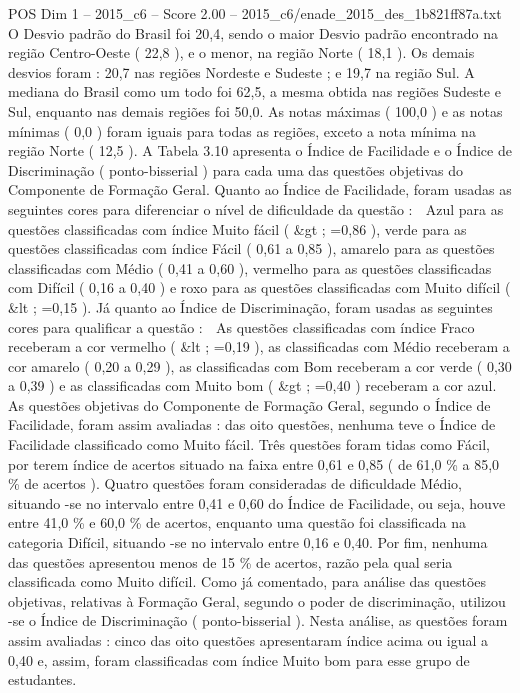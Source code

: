 \begin{textsample}{POS Dim 1 – 2015\_c6 – Score 2.00 – 2015\_c6/enade\_2015\_des\_1b821ff87a.txt}
O Desvio padrão do Brasil foi 20,4, sendo o maior Desvio padrão encontrado na região Centro-Oeste ( 22,8 ), e o menor, na região Norte ( 18,1 ).
Os demais desvios foram : 20,7 nas regiões Nordeste e Sudeste ; e 19,7 na região Sul.
A mediana do Brasil como um todo foi 62,5, a mesma obtida nas regiões Sudeste e Sul, enquanto nas demais regiões foi 50,0.
As notas máximas ( 100,0 ) e as notas mínimas ( 0,0 ) foram iguais para todas as regiões, exceto a nota mínima na região Norte ( 12,5 ).
A Tabela 3.10 apresenta o Índice de Facilidade e o Índice de Discriminação ( ponto-bisserial ) para cada uma das questões objetivas do Componente de Formação Geral.
Quanto ao Índice de Facilidade, foram usadas as seguintes cores para diferenciar o nível de dificuldade da questão :  Azul para as questões classificadas com índice Muito fácil ( \&gt ; =0,86 ), verde para as questões classificadas com índice Fácil ( 0,61 a 0,85 ), amarelo para as questões classificadas com Médio ( 0,41 a 0,60 ), vermelho para as questões classificadas com Difícil ( 0,16 a 0,40 ) e roxo para as questões classificadas com Muito difícil ( \&lt ; =0,15 ).
Já quanto ao Índice de Discriminação, foram usadas as seguintes cores para qualificar a questão :  As questões classificadas com índice Fraco receberam a cor vermelho ( \&lt ; =0,19 ), as classificadas com Médio receberam a cor amarelo ( 0,20 a 0,29 ), as classificadas com Bom receberam a cor verde ( 0,30 a 0,39 ) e as classificadas com Muito bom ( \&gt ; =0,40 ) receberam a cor azul.
As questões objetivas do Componente de Formação Geral, segundo o Índice de Facilidade, foram assim avaliadas : das oito questões, nenhuma teve o Índice de Facilidade classificado como Muito fácil.
Três questões foram tidas como Fácil, por terem índice de acertos situado na faixa entre 0,61 e 0,85 ( de 61,0 \% a 85,0 \% de acertos ).
Quatro questões foram consideradas de dificuldade Médio, situando -se no intervalo entre 0,41 e 0,60 do Índice de Facilidade, ou seja, houve entre 41,0 \% e 60,0 \% de acertos, enquanto uma questão foi classificada na categoria Difícil, situando -se no intervalo entre 0,16 e 0,40.
Por fim, nenhuma das questões apresentou menos de 15 \% de acertos, razão pela qual seria classificada como Muito difícil.
Como já comentado, para análise das questões objetivas, relativas à Formação Geral, segundo o poder de discriminação, utilizou -se o Índice de Discriminação ( ponto-bisserial ).
Nesta análise, as questões foram assim avaliadas : cinco das oito questões apresentaram índice acima ou igual a 0,40 e, assim, foram classificadas com índice Muito bom para esse grupo de estudantes.

\end{textsample}
